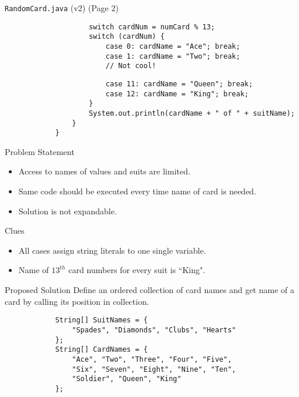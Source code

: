 \documentclass[10pt, compress]{beamer}
\begin{document}
\begin{slide}
	\begin{block}{\texttt{RandomCard.java} (v2) (Page 2)}
		\begin{verbatim}
			        switch cardNum = numCard % 13;
			        switch (cardNum) {
			            case 0: cardName = "Ace"; break;
			            case 1: cardName = "Two"; break;
			            // Not cool!
		\end{verbatim}
		\begin{verbatim}
			            case 11: cardName = "Queen"; break;
			            case 12: cardName = "King"; break;
			        }
			        System.out.println(cardName + " of " + suitName);
			    }
			}
		\end{verbatim}
	\end{block}
\end{slide}

\begin{slide}
	\begin{block}{Problem Statement}
		\begin{itemize}
			\item[] Access to names of values and suits are limited.
			\item[] Same code should be executed every time name of card is needed.
			\item[] Solution is not expandable.
		\end{itemize}
	\end{block}
	\begin{block}{Clues}
		\begin{itemize}
			\item[] All cases assign string literals to one single variable.
			\item[] Name of $13^{th}$ card numbers for every suit is ``King".
		\end{itemize}
	\end{block}
\end{slide}

\begin{slide}
	\begin{block}{Proposed Solution}
		Define an ordered collection of card names and get name of a card by calling its position in collection.
		\begin{verbatim}
			String[] SuitNames = {
			    "Spades", "Diamonds", "Clubs", "Hearts"
			};
			String[] CardNames = {
			    "Ace", "Two", "Three", "Four", "Five",
			    "Six", "Seven", "Eight", "Nine", "Ten",
			    "Soldier", "Queen", "King"
			};
		\end{verbatim}
	\end{block}
\end{slide}
\end{document}
